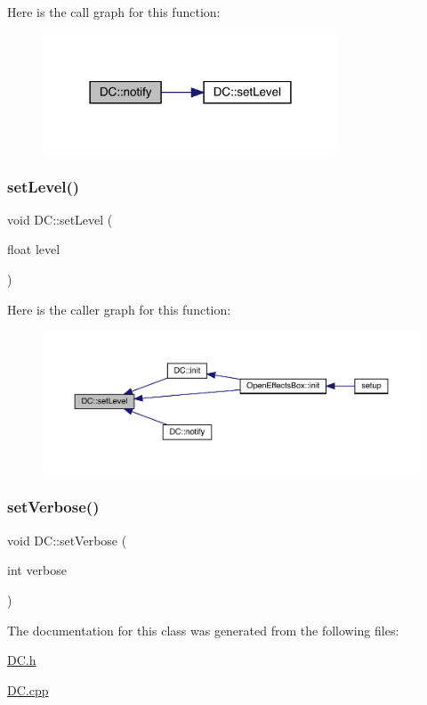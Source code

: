 Here is the call graph for this function\+:\nopagebreak
\begin{figure}[H]
\begin{center}
\leavevmode
\includegraphics[width=249pt]{class_d_c_a45e51132fbd69668134f3ab13f3668b1_cgraph}
\end{center}
\end{figure}
\mbox{\label{class_d_c_aa7f1c23c91d43443c018cc48ab6db5ef}} 
\subsubsection{\texorpdfstring{set\+Level()}{setLevel()}}
{\footnotesize\ttfamily void D\+C\+::set\+Level (\begin{DoxyParamCaption}\item[{float}]{level }\end{DoxyParamCaption})}

Here is the caller graph for this function\+:\nopagebreak
\begin{figure}[H]
\begin{center}
\leavevmode
\includegraphics[width=350pt]{class_d_c_aa7f1c23c91d43443c018cc48ab6db5ef_icgraph}
\end{center}
\end{figure}
\mbox{\label{class_d_c_a1fb27467a4ab9013b6b01fb6295ada42}} 
\subsubsection{\texorpdfstring{set\+Verbose()}{setVerbose()}}
{\footnotesize\ttfamily void D\+C\+::set\+Verbose (\begin{DoxyParamCaption}\item[{int}]{verbose }\end{DoxyParamCaption})}



The documentation for this class was generated from the following files\+:\begin{DoxyCompactItemize}
\item 
\mbox{\hyperlink{_d_c_8h}{D\+C.\+h}}\item 
\mbox{\hyperlink{_d_c_8cpp}{D\+C.\+cpp}}\end{DoxyCompactItemize}
